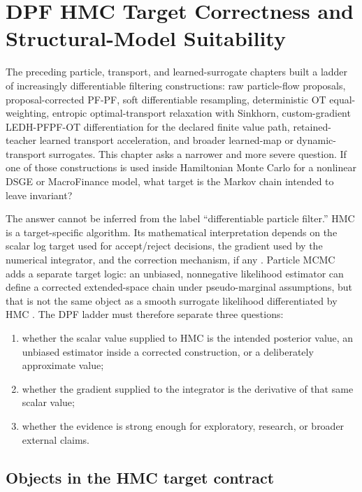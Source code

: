 \chapter{DPF HMC Target Correctness and Structural-Model Suitability}
\label{ch:bf-dpf-hmc-target-suitability}

The preceding particle, transport, and learned-surrogate chapters built a ladder
of increasingly differentiable filtering constructions: raw particle-flow
proposals, proposal-corrected PF-PF, soft differentiable resampling,
deterministic OT equal-weighting, entropic optimal-transport relaxation with
Sinkhorn, custom-gradient LEDH-PFPF-OT differentiation for the declared finite
value path, retained-teacher learned transport acceleration, and broader
learned-map or dynamic-transport surrogates.
This chapter asks a narrower and more severe
question.  If one of those constructions is used inside Hamiltonian Monte Carlo
for a nonlinear DSGE or MacroFinance model, what target is the Markov chain
intended to leave invariant?

The answer cannot be inferred from the label ``differentiable particle
filter.''  HMC is a target-specific algorithm.  Its mathematical interpretation
depends on the scalar log target used for accept/reject decisions, the gradient
used by the numerical integrator, and the correction mechanism, if any
\citep{neal2011mcmc,betancourt2017conceptual}.  Particle MCMC adds a separate
target logic: an unbiased, nonnegative likelihood estimator can define a
corrected extended-space chain under pseudo-marginal assumptions, but that is
not the same object as a smooth surrogate likelihood differentiated by HMC
\citep{andrieu2009pseudo,andrieu2010particle}.  The DPF ladder must therefore
separate three questions:
\begin{enumerate}[label=(\roman*)]
  \item whether the scalar value supplied to HMC is the intended posterior
    value, an unbiased estimator inside a corrected construction, or a
    deliberately approximate value;
  \item whether the gradient supplied to the integrator is the derivative of
    that same scalar value;
  \item whether the evidence is strong enough for exploratory, research, or
    broader external claims.
\end{enumerate}

\section{Objects in the HMC target contract}
\label{sec:bf-dpf-hmc-contract}


